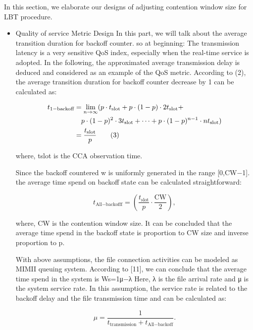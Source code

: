 \documentclass{IEEEtran}
\begin{document}
In this section, we elaborate our designs of adjusting contention window size for LBT procedure.
\begin{itemize}
    \item  Quality of service Metric Design
    In this part, we will talk about the average transition duration for backoff counter.
    so at beginning: 
    The transmission latency is a very sensitive QoS index, especially when the real-time service is adopted. In the following, the approximated average transmission delay is deduced and considered as an example of the QoS metric. According to (2), the average transition duration for backoff counter decrease by 1 can be calculated as:
    
    \begin{align*}t_{1-\text{backoff}}&=\lim_{n\rightarrow\infty}(p\cdot t_{\text{slot}}+p\cdot(1-p)\cdot 2t_{\text{slot}}+\notag\\ &\quad p\cdot(1-p)^{2}\cdot 3t_{\text{slot}}+\cdots+p\cdot(1-p)^{n-1}\cdot nt_{\text{slot}})\notag\\ &=\frac{t_{\text{slot}}}{p}\tag{3}\end{align*}
    
    where, tslot is the CCA observation time.

Since the backoff countered w is uniformly generated in the range [0,CW−1]. the average time spend on backoff state can be calculated straightforward:
    
    \begin{equation*}t_{\text{All}-\text{backofff}} = (\frac{t_{\text{slot}}}{p}\cdot \frac{\text{CW}}{2}), \tag{4}\end{equation*}
    
    where, CW is the contention window size. It can be concluded that the average time spend in the backoff state is proportion to CW size and inverse proportion to p.

With above assumptions, the file connection activities can be modeled as MIMII queuing system. According to [11], we can conclude that the average time spend in the system is Ws=1μ−λ Here, λ is the file arrival rate and μ is the system service rate. In this assumption, the service rate is related to the backoff delay and the file transmission time and can be calculated as:
   
   
   \begin{equation*}\mu=\frac{1}{t_{\text{transmission}}+t_{\text{All}-\text{backoff}}}. \tag{5}\end{equation*}
   

\end{itemize}
\end{document}
